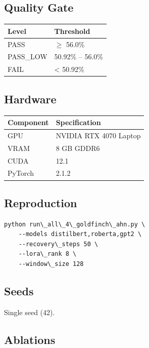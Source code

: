 \subsection{Quality Gate}

\begin{table}[H]
\centering
\small
\begin{tabular}{ll}
\toprule
\textbf{Level} & \textbf{Threshold} \\
\midrule
PASS & $\ge$ 56.0\% \\
PASS\_LOW & 50.92\% -- 56.0\% \\
FAIL & \textless{} 50.92\% \\
\bottomrule
\end{tabular}
\end{table}

\subsection{Hardware}

\begin{table}[H]
\centering
\small
\begin{tabular}{ll}
\toprule
\textbf{Component} & \textbf{Specification} \\
\midrule
GPU & NVIDIA RTX 4070 Laptop \\
VRAM & 8 GB GDDR6 \\
CUDA & 12.1 \\
PyTorch & 2.1.2 \\
\bottomrule
\end{tabular}
\end{table}

\subsection{Reproduction}

\begin{lstlisting}
python run\_all\_4\_goldfinch\_ahn.py \
    --models distilbert,roberta,gpt2 \
    --recovery\_steps 50 \
    --lora\_rank 8 \
    --window\_size 128
\end{lstlisting}

\subsection{Seeds}

Single seed (42).

\subsection{Ablations}

